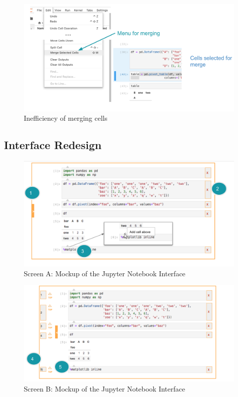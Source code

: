 \documentclass[12pt,letterpaper]{article}
\begin{document}
\begin{figure}[h]
\centering
\includegraphics[scale=.55]{figures/project-principles/cell_merge_eval.png}
\caption{Inefficiency of merging cells}
\label{fig::3}
\end{figure}


\subsection*{Interface Redesign}

\begin{figure}[h]
\centering
\includegraphics[scale=.6]{figures/project-principles/jupyter_mock_screen_a.png}
\caption{Screen A: Mockup of the Jupyter Notebook Interface}
\label{fig::4}
\end{figure}

\begin{figure}[h]
\centering
\includegraphics[scale=.6]{figures/project-principles/jupyter_mock_screen_b.png}
\caption{Screen B: Mockup of the Jupyter Notebook Interface}
\label{fig::5}
\end{figure}
\end{document}
